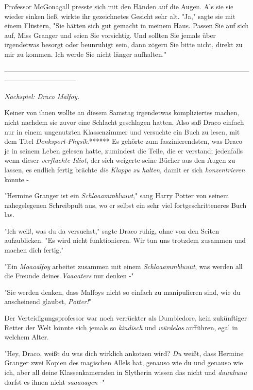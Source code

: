 {Professor McGonagall presste sich mit den Händen auf die Augen. Als sie sie wieder sinken ließ, wirkte ihr gezeichnetes Gesicht sehr alt. "Ja," sagte sie mit einem Flüstern, "Sie hätten sich gut gemacht in meinem Haus. Passen Sie auf sich auf, Miss Granger und seien Sie vorsichtig. Und sollten Sie jemals über irgendetwas besorgt oder beunruhigt sein, dann zögern Sie bitte nicht, direkt zu mir zu kommen. Ich werde Sie nicht länger aufhalten."

--------------------------------------------------------------------------------------------------------------------------------------------

\emph{Nachspiel: Draco Malfoy.}

Keiner von ihnen wollte an diesem Samstag irgendetwas kompliziertes machen, nicht nachdem sie zuvor eine Schlacht geschlagen hatten. Also saß Draco einfach nur in einem ungenutzten Klassenzimmer und versuchte ein Buch zu lesen, mit dem Titel \emph{Denksport-Physik}.****** Es gehörte zum faszinierendsten, was Draco je in seinem Leben gelesen hatte, zumindest die Teile, die er verstand; jedenfalls wenn dieser \emph{verfluchte Idiot}, der sich weigerte seine Bücher aus den Augen zu lassen, es endlich fertig brächte \emph{die Klappe zu halten}, damit er sich \emph{konzentrieren} könnte -

"Hermine Granger ist ein \emph{Schlaaammbluuut}," sang Harry Potter von seinem nahegelegenen Schreibpult aus, wo er selbst ein sehr viel fortgeschritteneres Buch las.

"Ich weiß, was du da versuchst," sagte Draco ruhig, ohne von den Seiten aufzublicken. "Es wird nicht funktionieren. Wir tun uns trotzdem zusammen und machen dich fertig."

"Ein \emph{Maaaalfoy} arbeitet zusammen mit einem \emph{Schlaaammbluuut}, was werden all die Freunde deines \emph{Vaaaaters} nur denken -"

"Sie werden denken, dass Malfoys nicht so einfach zu manipulieren sind, wie du anscheinend glaubst, \emph{Potter!}"

Der Verteidigungsprofessor war noch verrückter als Dumbledore, kein zukünftiger Retter der Welt könnte sich jemals so \emph{kindisch} und \emph{würdelos} aufführen, egal in welchem Alter.

"Hey, Draco, weißt du was dich wirklich ankotzen wird? \emph{Du} weißt, dass Hermine Granger zwei Kopien des magischen Allels hat, genauso wie du und genauso wie ich, aber all deine Klassenkameraden in Slytherin wissen das nicht und \emph{duuuhuuu} darfst es ihnen nicht \emph{saaaaagen} -"

}

